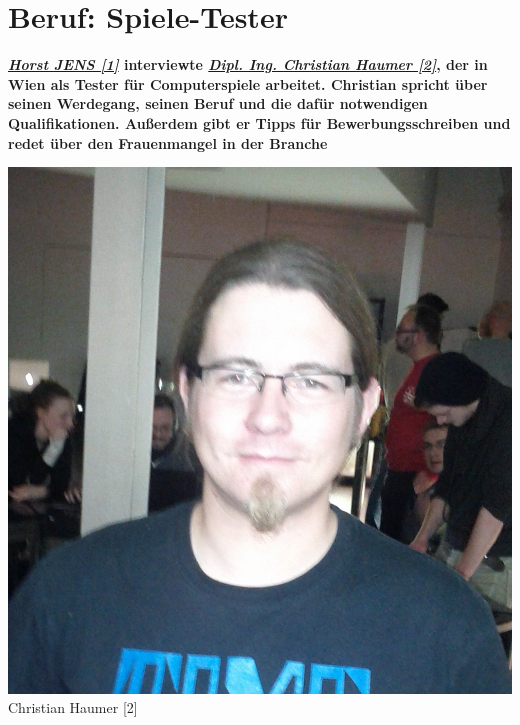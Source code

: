 \section*{Beruf: Spiele-Tester}
\label{spieletester}


\textbf{\href{http://spielend-programmieren.at}{\textit{Horst JENS [1]}} interviewte \href{http://www.humepage.at}{\textit{Dipl. Ing. Christian Haumer [2]}}, der in Wien als Tester für Computerspiele  arbeitet. Christian spricht über seinen Werdegang, seinen Beruf und die dafür notwendigen Qualifikationen. Außerdem gibt er Tipps für Bewerbungsschreiben und redet über den Frauenmangel in der Branche}

\begin{center}
\includegraphics[width=0.8\linewidth]{spieletester/spieletester-christian-haumer.jpg}\\
\footnotesize{Christian Haumer [2]}
\end{center}

